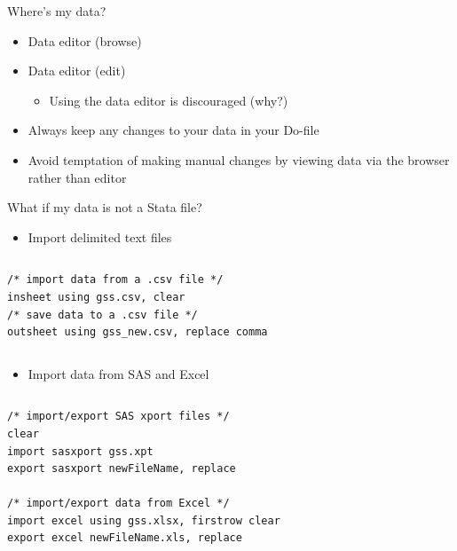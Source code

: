\documentclass[table,smaller]{beamer}
\begin{document}
\begin{frame}[label=sec-2-3]{Where's my data?}
\begin{itemize}
\item Data editor (\alert{browse})
\item Data editor (\alert{edit})
\begin{itemize}
\item Using the data editor is discouraged (why?)
\end{itemize}
\item Always keep any changes to your data in your Do-file
\item Avoid temptation of making manual changes by viewing data via the browser rather than editor
\end{itemize}
\end{frame}

\begin{frame}[fragile,label=sec-2-4]{What if my data is not a Stata file?}
 \begin{itemize}
\item Import delimited text files
\end{itemize}
\vspace{-.5em} \begin{columns}  \begin{block}{}
\begin{verbatim}
/* import data from a .csv file */
insheet using gss.csv, clear
/* save data to a .csv file */
outsheet using gss_new.csv, replace comma
\end{verbatim}

\end{block} \end{columns}

\begin{itemize}
\item Import data from SAS and Excel
\end{itemize}
\vspace{-.5em} \begin{columns}  \begin{block}{}
\begin{verbatim}
/* import/export SAS xport files */
clear
import sasxport gss.xpt
export sasxport newFileName, replace

/* import/export data from Excel */
import excel using gss.xlsx, firstrow clear
export excel newFileName.xls, replace
\end{verbatim}

\end{block} \end{columns}
\end{frame}
\end{document}
